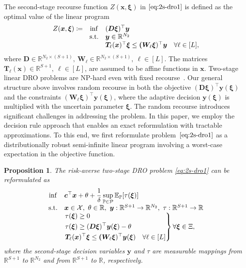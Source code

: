 \documentclass{article}
\newcommand{\st}{\textnormal{s.t.}}
\newcommand{\PP}{\mathbb{P}}
\newcommand{\EE}{\mathbb{E}}
\newcommand{\RR}{\mathbb{R}}
\newcommand{\X}{\mathcal{X}}
\newtheorem{proposition}{Proposition}
\begin{document}
The second-stage recourse function $Z(\bm x, \bm \xi)$ in $\eqref{eq:2s-dro1}$ is defined as the optimal value of the linear program
\begin{equation}
\label{eq:second_stage_value}
\begin{array}{ccl}
Z(\bm x, \bm \xi) \coloneqq & \displaystyle \inf & (\bm D \bm\xi)^\top \bm y \\
& \st & \bm y \in \RR^{N_2}\\
& & \bm T_\ell(\bm x)^\top\bm \xi  \leq \bm (\bm W_\ell\bm\xi)^\top\bm y \quad \forall \ell \in [L],
\end{array}
\end{equation}
where $\bm D \in \RR^{N_2 \times (S+1)}, \ \bm W_\ell \in \RR^{N_2 \times (S+1)}, \ \ell \in [L]$. The matrices $\bm T_\ell(\bm x) \in \RR^{S+1}, \ \ell \in [L]$, are assumed to be affine functions in $\bm x$. Two-stage linear DRO problems  
are NP-hard even with fixed recourse~\cite{DRO-NPhard}. 
Our general structure above involves random recourse in both the objective $(\bm D \bm\xi)^\top \bm y(\bm \xi)$ and the constraints $(\bm W_\ell\bm\xi)^\top\bm y(\bm \xi)$, where the adaptive decision $\bm y(\bm \xi)$ is multiplied  with the uncertain parameter $\bm \xi$. The random recourse introduces significant challenges in addressing the problem. In this paper, we employ the decision rule approach that enables an exact reformulation with tractable approximations. To this end, we first reformulate problem~$\eqref{eq:2s-dro1}$ as a distributionally robust semi-infinite linear program involving a worst-case expectation in the objective function.

\begin{proposition}
The risk-averse two-stage DRO problem \eqref{eq:2s-dro1} can be reformulated as
\begin{equation}
\label{eq:2s-dro2}
\begin{array}{clll}
\displaystyle \inf & \displaystyle \bm c^\top \bm x + \theta + \frac{1}{\delta} \sup_{\PP\in\mathcal P} \EE_\PP [\tau(\bm \xi)] \\
\st & \bm x \in \X, \ \theta \in \RR, \ \bm y: \RR^{S+1} \rightarrow \RR^{N_2}, \ \tau: \RR^{S+1} \rightarrow \RR\\
& \left. 
\begin{aligned}
& \tau(\bm \xi) \geq 0 \\
& \tau(\bm \xi) \geq (\bm D \bm \xi)^\top \bm y (\bm \xi) - \theta \\
& \bm T_\ell(\bm x)^\top\bm \xi  \leq \bm (\bm W_\ell \bm\xi)^\top\bm y(\bm \xi) \quad \forall \ell \in [L] \\
\end{aligned} \right \} \forall \bm\xi \in \Xi,
\end{array}
\end{equation}
where the second-stage decision variables $\bm y$ and $\tau$ are measurable mappings from $\RR^{S+1}$ to $\RR^{N_2}$ and  from $\RR^{S+1}$ to $\RR$, respectively.
\end{proposition}
\end{document}

